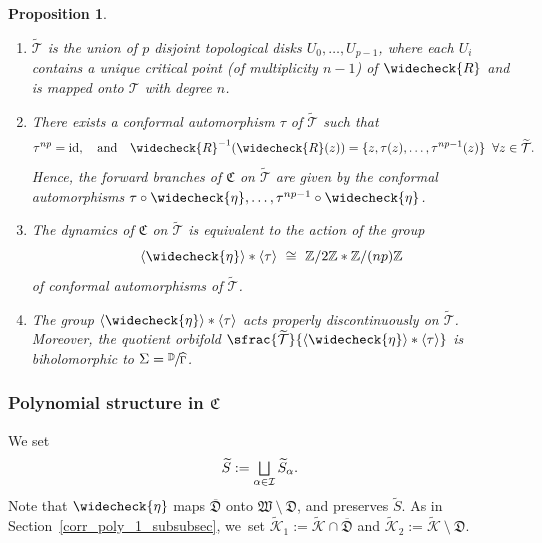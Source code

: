 \documentclass[JEP,XML,SOM,Unicode,NoFloatCountersInSection,published]{cedram}
\let\oldbigsqcup\bigsqcup
\renewcommand{\bigsqcup}{\mathop{\textstyle\oldbigsqcup}\displaylimits}
\let\faktor\sfrac
\newtheorem{proposition}[lemma]{Proposition}
\theoremstyle{definition}
\theoremstyle{remark}
\newcommand{\D}{\mathbb{D}}
\newcommand{\Z}{\mathbb{Z}}
\newcommand{\cT}{\mathcal{T}}
\begin{document}
\skpt
\begin{proposition}\label{grand_orbit_group_gen_prop}
\begin{enumerate}
\item $\widetilde{\cT}$ is the union of $p$ disjoint topological disks $U_0,\dots,U_{p-1}$, where each $U_i$ contains a unique critical point (of multiplicity $n-1$) of $\widecheck{R}$ and is mapped onto $\cT$ with degree $n$.

\item There exists a conformal automorphism $\tau$ of $\widetilde{\mathcal{T}}$ such that
\[
\tau^{np}=\mathrm{id},\quad \text{and}\quad \widecheck{R}^{-1}(\widecheck{R}(z))=\{z,\tau(z),\dots,\tau^{np-1}(z)\}\;\; \forall z\in \widetilde{\mathcal{T}}.
\]
Hence, the forward branches of $\mathfrak{C}$ on $\widetilde{\mathcal{T}}$ are given by the conformal automorphisms $\tau\circ\widecheck{\eta},\dots,\tau^{np-1}\circ\widecheck{\eta}$.

\item The dynamics of $\mathfrak{C}$ on $\widetilde{\cT}$ is equivalent to the action of the group
\[
\langle\widecheck{\eta}\rangle\ast\langle\tau\rangle\ \cong\ \Z/2\Z\ast\Z/(np)\Z
\]
of conformal automorphisms of $\widetilde{\cT}$.

\item The group $\langle\widecheck{\eta}\rangle\ast\langle\tau\rangle$ acts properly discontinuously on $\widetilde{\cT}$. Moreover, the quotient orbifold $\faktor{\widetilde{\cT}}{\langle\widecheck{\eta}\rangle\ast\langle\tau\rangle}$ is biholomorphic to $\Sigma=\faktor{\D}{\widehat{\Gamma}}$.
\end{enumerate}
\end{proposition}

\subsubsection{Polynomial structure in $\mathfrak{C}$}\label{corr_poly_2_subsubsec}

We set
\[
\widetilde{S}:=\bigsqcup_{\alpha\in\mathcal{I}}\widetilde{S}_{\alpha}.
\]
Note that $\widecheck{\eta}$ maps $\overline{\mathfrak{D}}$ onto $\mathfrak{W}\ \setminus\ \mathfrak{D}$, and preserves $\widetilde{S}$.
As in Section~\ref{corr_poly_1_subsubsec}, we~set $\widetilde{\mathcal{K}}_1:=\widetilde{\mathcal{K}}\cap\overline{\mathfrak{D}}$ and $\widetilde{\mathcal{K}}_2:=\widetilde{\mathcal{K}}\ \setminus\ \mathfrak{D}$.
\end{document}
